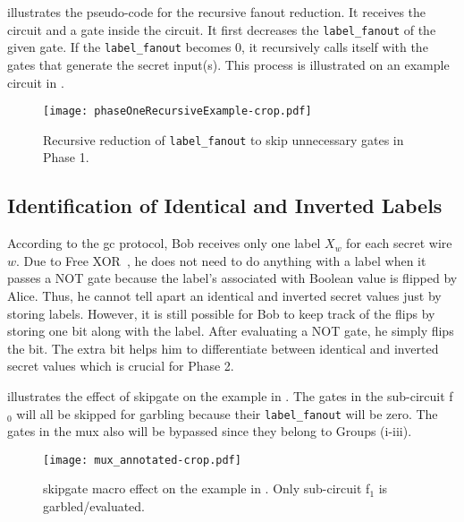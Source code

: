  illustrates the pseudo-code for the recursive fanout reduction.
It receives the circuit and a gate inside the circuit.
It first decreases the \texttt{label\_fanout} of the given gate.
If the \texttt{label\_fanout} becomes 0, it recursively calls itself with the gates that generate the secret input(s).
This process is illustrated on an example circuit in .

\begin{figure}[h]
    \centering
    \texttt{[image: phaseOneRecursiveExample-crop.pdf]}
    \caption{Recursive reduction of \texttt{label\_fanout} to skip unnecessary gates in Phase 1.}
    \label{fig:phaseOneRecursive}
\end{figure}

\subsection{Identification of Identical and Inverted Labels}\label{ssec:skipgate-ident}
According to the \acrshort{gc} protocol, Bob receives only one label $X_w$ for each secret wire $w$.
Due to Free XOR~\cite{kolesnikov2008improved}, he does not need to do anything with a label when it passes a NOT gate because the label's associated with Boolean value is flipped by Alice.
Thus, he cannot tell apart an identical and inverted secret values just by storing labels.
However, it is still possible for Bob to keep track of the flips by storing one bit along with the label.
After evaluating a NOT gate, he simply flips the bit.
The extra bit helps him to differentiate between identical and inverted secret values which is crucial for Phase 2.

 illustrates the effect of \gls{skipgate} on the example in .
The gates in the sub-circuit f$_0$ will all be skipped for garbling because their \texttt{label\_fanout} will be zero.
The gates in the \acrshort{mux} also will be bypassed since they belong to Groups (i-iii).

\begin{figure}[h]
    \centering
    \texttt{[image: mux\_annotated-crop.pdf]}
    \caption{\gls{skipgate} macro effect on the example in .
    		 Only sub-circuit f$_1$ is garbled/evaluated.}
\label{fig:mux_annotated}
\end{figure}

